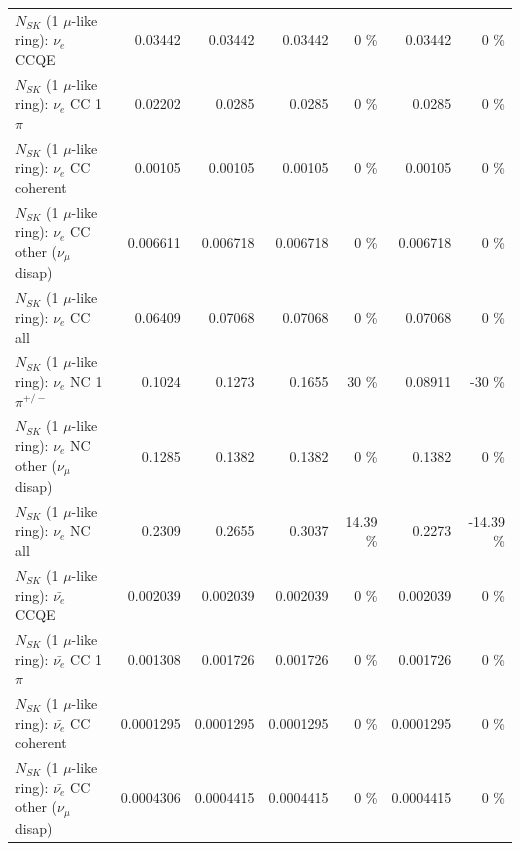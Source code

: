 \begin{table}
\begin{tabular}{| l | r | r | r  r | r  r |}
\hline
\hline
\hline
                                      $N_{SK}$ (1 $\mu$-like ring): $\nu_e$ CCQE &         0.03442 &         0.03442 &         0.03442 &        0 \%  &         0.03442 &        0 \%  \\ 
                                 $N_{SK}$ (1 $\mu$-like ring): $\nu_e$ CC 1$\pi$ &         0.02202 &          0.0285 &          0.0285 &        0 \%  &          0.0285 &        0 \%  \\ 
                               $N_{SK}$ (1 $\mu$-like ring): $\nu_e$ CC coherent &         0.00105 &         0.00105 &         0.00105 &        0 \%  &         0.00105 &        0 \%  \\ 
                $N_{SK}$ (1 $\mu$-like ring): $\nu_e$ CC other ($\nu_\mu$ disap) &        0.006611 &        0.006718 &        0.006718 &        0 \%  &        0.006718 &        0 \%  \\ 
                                  $N_{SK}$ (1 $\mu$-like ring): $\nu_{e}$ CC all &         0.06409 &         0.07068 &         0.07068 &        0 \%  &         0.07068 &        0 \%  \\ 
\hline
                           $N_{SK}$ (1 $\mu$-like ring): $\nu_e$ NC 1$\pi^{+/-}$ &          0.1024 &          0.1273 &          0.1655 &       30 \%  &         0.08911 &      -30 \%  \\ 
                $N_{SK}$ (1 $\mu$-like ring): $\nu_e$ NC other ($\nu_\mu$ disap) &          0.1285 &          0.1382 &          0.1382 &        0 \%  &          0.1382 &        0 \%  \\ 
                                  $N_{SK}$ (1 $\mu$-like ring): $\nu_{e}$ NC all &          0.2309 &          0.2655 &          0.3037 &    14.39 \%  &          0.2273 &   -14.39 \%  \\ 
\hline
\hline
\hline
                                $N_{SK}$ (1 $\mu$-like ring): $\bar{\nu_e}$ CCQE &        0.002039 &        0.002039 &        0.002039 &        0 \%  &        0.002039 &        0 \%  \\ 
                           $N_{SK}$ (1 $\mu$-like ring): $\bar{\nu_e}$ CC 1$\pi$ &        0.001308 &        0.001726 &        0.001726 &        0 \%  &        0.001726 &        0 \%  \\ 
                         $N_{SK}$ (1 $\mu$-like ring): $\bar{\nu_e}$ CC coherent &       0.0001295 &       0.0001295 &       0.0001295 &        0 \%  &       0.0001295 &        0 \%  \\ 
          $N_{SK}$ (1 $\mu$-like ring): $\bar{\nu_e}$ CC other ($\nu_\mu$ disap) &       0.0004306 &       0.0004415 &       0.0004415 &        0 \%  &       0.0004415 &        0 \%  \\ 

\end{tabular}
\end{table}
